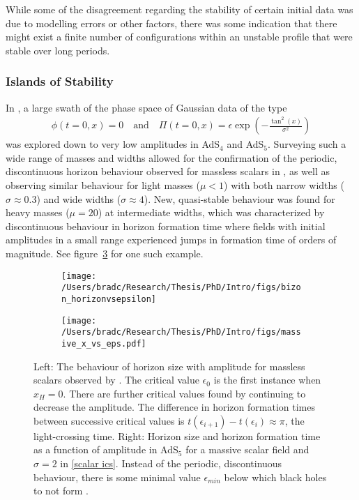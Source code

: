 \documentclass[../PhD.tex]{subfiles}
\begin{document}
While some of the disagreement regarding the stability of certain initial data was due to modelling errors or other factors, there was some indication that there might exist a finite number of configurations within an unstable profile that were stable over long periods. 

\subsubsection{Islands of Stability}
\label{ssub: islands}
 
In \cite{1508.02709}, a large swath of the phase space of Gaussian data of the type
\begin{align}
\label{scalar ics}
\phi(t=0,x) = 0 \quad \text{and} \quad \Pi (t=0,x) = \epsilon \exp \left( - \frac{\tan^2 (x)}{\sigma^2} \right)
\end{align}
was explored down to very low amplitudes in AdS$_4$ and AdS$_5$. Surveying such a wide range of masses and widths allowed for the confirmation of the periodic, discontinuous horizon behaviour observed for massless scalars in \cite{1104.3702}, as well as observing similar behaviour for light masses ($\mu < 1$) with both narrow widths ($\sigma \approx 0.3$) and wide widths ($\sigma \approx 4$). New, quasi-stable behaviour was found for heavy masses ($\mu = 20$) at intermediate widths, which was characterized by discontinuous behaviour in horizon formation time where fields with initial amplitudes in a small range experienced jumps in formation time of orders of magnitude. See figure~\ref{fig: massive x vs eps} for one such example.

\begin{figure}[h]
	\centering
	\begin{subfigure}[t]{0.45\textwidth}
		\texttt{[image: /Users/bradc/Research/Thesis/PhD/Intro/figs/bizon\_horizonvsepsilon]}	
		\label{fig: x vs eps}
	\end{subfigure} 
	\;
	\begin{subfigure}[t]{0.45\textwidth}
		\texttt{[image: /Users/bradc/Research/Thesis/PhD/Intro/figs/massive\_x\_vs\_eps.pdf]}
		\label{fig: massive x vs eps}
	\end{subfigure}
	\caption[Horizon size and horizon formation time for massless and massive scalars]{Left: The behaviour of horizon size with amplitude for massless scalars observed by {\rm\cite{1104.3702}}. The critical value $\epsilon_0$ is the first instance when $x_H = 0$. There are further critical values found by continuing to decrease the amplitude. The difference in horizon formation times between successive critical values is $t(\epsilon_{i+1}) - t(\epsilon_i) \approx \pi$, the light-crossing time. Right: Horizon size and horizon formation time as a function of amplitude in AdS$_5$ for a massive scalar field and $\sigma = 2$ in {\rm\eqref{scalar ics}}. Instead of the periodic, discontinuous behaviour, there is some minimal value $\epsilon_{min}$ below which black holes to not form {\rm\cite{1508.02709}}.}
\end{figure}
\end{document}
